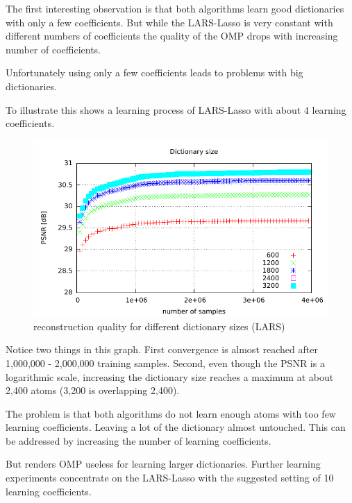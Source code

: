 
The first interesting observation is that both algorithms learn good
dictionaries with only a few coefficients. But while the LARS-Lasso is very
constant with different numbers of coefficients the quality of the OMP drops
with increasing number of coefficients. 



Unfortunately using only a few coefficients leads to problems with big
dictionaries. 

To illustrate this  shows a learning process of
LARS-Lasso with about 4 learning coefficients.
\begin{figure}[H]
\centering
\includegraphics[width = 1.0\textwidth]{../tests/results/dictSizeLasso.pdf}
\caption{reconstruction quality for different dictionary sizes (LARS)}
\label{fig:dictSizeLassoBad}
\end{figure}
Notice two things in this graph. First convergence is almost reached
after 1,000,000 - 2,000,000 training samples. Second, even though the PSNR is a
logarithmic scale, increasing the dictionary size reaches a maximum at
about 2,400 atoms (3,200 is overlapping 2,400). 

The problem is that both algorithms do not learn enough atoms with too few
learning coefficients. Leaving a lot of the dictionary almost untouched. This
can be addressed by increasing the number of learning coefficients.

But renders OMP useless for learning larger dictionaries. Further learning
experiments concentrate on the LARS-Lasso with the suggested setting of 10
learning coefficients.

